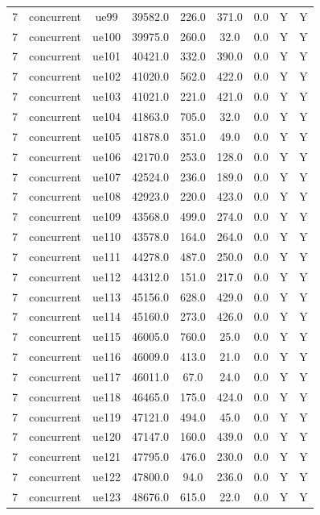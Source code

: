 \begin{table}[ht]
\begin{tabular}{|c|c|c|c|c|c|c|c|c|}
7 & concurrent & ue99 & 39582.0 & 226.0 & 371.0 & 0.0 & Y & Y \\
7 & concurrent & ue100 & 39975.0 & 260.0 & 32.0 & 0.0 & Y & Y \\
7 & concurrent & ue101 & 40421.0 & 332.0 & 390.0 & 0.0 & Y & Y \\
7 & concurrent & ue102 & 41020.0 & 562.0 & 422.0 & 0.0 & Y & Y \\
7 & concurrent & ue103 & 41021.0 & 221.0 & 421.0 & 0.0 & Y & Y \\
7 & concurrent & ue104 & 41863.0 & 705.0 & 32.0 & 0.0 & Y & Y \\
7 & concurrent & ue105 & 41878.0 & 351.0 & 49.0 & 0.0 & Y & Y \\
7 & concurrent & ue106 & 42170.0 & 253.0 & 128.0 & 0.0 & Y & Y \\
7 & concurrent & ue107 & 42524.0 & 236.0 & 189.0 & 0.0 & Y & Y \\
7 & concurrent & ue108 & 42923.0 & 220.0 & 423.0 & 0.0 & Y & Y \\
7 & concurrent & ue109 & 43568.0 & 499.0 & 274.0 & 0.0 & Y & Y \\
7 & concurrent & ue110 & 43578.0 & 164.0 & 264.0 & 0.0 & Y & Y \\
7 & concurrent & ue111 & 44278.0 & 487.0 & 250.0 & 0.0 & Y & Y \\
7 & concurrent & ue112 & 44312.0 & 151.0 & 217.0 & 0.0 & Y & Y \\
7 & concurrent & ue113 & 45156.0 & 628.0 & 429.0 & 0.0 & Y & Y \\
7 & concurrent & ue114 & 45160.0 & 273.0 & 426.0 & 0.0 & Y & Y \\
7 & concurrent & ue115 & 46005.0 & 760.0 & 25.0 & 0.0 & Y & Y \\
7 & concurrent & ue116 & 46009.0 & 413.0 & 21.0 & 0.0 & Y & Y \\
7 & concurrent & ue117 & 46011.0 & 67.0 & 24.0 & 0.0 & Y & Y \\
7 & concurrent & ue118 & 46465.0 & 175.0 & 424.0 & 0.0 & Y & Y \\
7 & concurrent & ue119 & 47121.0 & 494.0 & 45.0 & 0.0 & Y & Y \\
7 & concurrent & ue120 & 47147.0 & 160.0 & 439.0 & 0.0 & Y & Y \\
7 & concurrent & ue121 & 47795.0 & 476.0 & 230.0 & 0.0 & Y & Y \\
7 & concurrent & ue122 & 47800.0 & 94.0 & 236.0 & 0.0 & Y & Y \\
7 & concurrent & ue123 & 48676.0 & 615.0 & 22.0 & 0.0 & Y & Y \\

\end{tabular}
\end{table}
